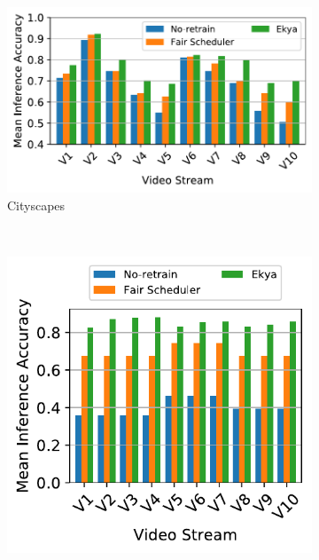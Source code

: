 

\begin{figure}
  \centering
  \begin{subfigure}[t]{0.5\linewidth}
    \centering
    \includegraphics[width=\linewidth]{results/multicam/multicam_individual_stream_acc_cityscapes.pdf} 
    \caption{Cityscapes}
    \label{fig:multicam-cities-cityscapes}
  \end{subfigure}
  ~~~
  \begin{subfigure}[t]{0.5\linewidth}
    \centering
    \includegraphics[width=\linewidth]{results/multicam/multicam_individual_stream_acc_waymo.pdf}

\end{subfigure}
\end{figure}
